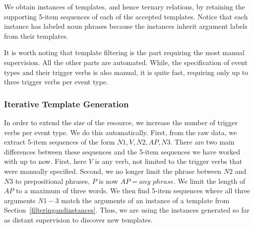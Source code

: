 We obtain instances of templates, and hence ternary relations, by  retaining the supporting 5-item sequences of each of the accepted templates.
 Notice that each instance  has labeled noun phrases  because the instances inherit  argument labels from their templates.
 
 
It is worth noting that  template filtering is the part requiring the most manual supervision. All the other parts are automated.  While, the specification of event types and their trigger verbs is also manual, it is quite fast, requiring only up to three trigger verbs per event type.  


 
 \subsubsection{Iterative Template Generation} \label{iterate}
 In order to extend the size of the resource, we  increase the number of trigger verbs per event type. We  do this automatically. First, from the raw data, we extract 5-item sequences of the form $N1, V, N2, AP, N3$. There are two main differences between these sequences and the 5-item sequences we have worked with up to now. First,  here $V$ is any verb, not limited to the trigger verbs that were manually specified. Second, we no longer limit the phrase between $N2$ and $N3$ to prepositional phrases, $P$ is now $AP=any$ $phrase$. We limit the length of $AP$ to a maximum of three words.  
 We then find 5-item sequences where all three arguments $N1-3$ match the arguments of an instance of a template from Section~\ref{filteringandinstances}.  Thus, we are using the instances generated so far as distant supervision to discover new templates. 
 
